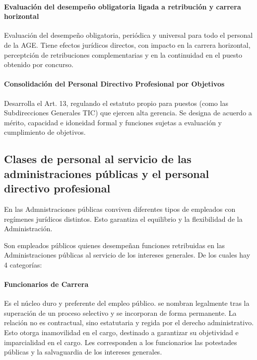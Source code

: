         \paragraph{Evaluación del desempeño obligatoria ligada a retribución y carrera horizontal}
            Evaluación del desempeño obligatoria, periódica y universal para todo el personal de la AGE. Tiene efectos jurídicos directos, con impacto en la carrera horizontal, perceptción de retribuciones complementarias y en la continuidad en el puesto obtenido por concurso.

        \paragraph{Consolidación del Personal Directivo Profesional por Objetivos}
            Desarrolla el Art. 13, regulando el estatuto propio para puestos (como las Subdirecciones Generales TIC) que ejercen alta gerencia. Se designa de acuerdo a mérito, capacidad e idoneidad formal y funciones sujetas a evaluación y cumplimiento de objetivos.

\subsection{Clases de personal al servicio de las administraciones públicas y el personal directivo profesional} %
    En las Admnistraciones públicas conviven diferentes tipos de empleados con regímenes jurídicos distintos. Esto garantiza el equilibrio y la flexibilidad de la Administración.

    Son empleados públicos quienes desempeñan funciones retribuidas en las Administraciones públicas al servicio de los intereses generales. De los cuales hay 4 categorías:

        \paragraph{Funcionarios de Carrera} 
            Es el núcleo duro y preferente del empleo público. se nombran legalmente tras la superación de un proceso selectivo y se incorporan de forma permanente. La relación no es contractual, sino estatutaria y regida por el derecho administrativo. Esto otorga inamovilidad en el cargo, destinado a garantizar su objetividad e imparcialidad en el cargo. Les corresponden a los funcionarios las potestades públicas y la salvaguardia de los intereses generales.

